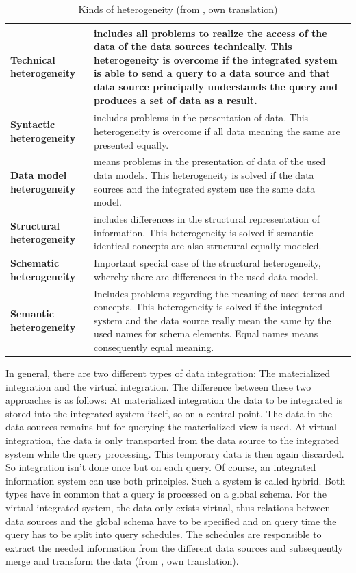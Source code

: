 \begin{table}[]
\centering
\begin{tabular}{|l|p{}|}
\hline
 \textbf{Technical  heterogeneity}  &  includes all problems to realize the access of the data of the data sources technically. This heterogeneity is overcome if the integrated system is able to send a query to a data source and that data source principally understands the query and produces a set of data as a result.\\ \hline
 \textbf{Syntactic  heterogeneity}    &  includes problems in the presentation of data. This heterogeneity is overcome if all data meaning the same are presented equally.\\ \hline
 \textbf{Data model  heterogeneity} &  means problems in the presentation of data of the used data models. This heterogeneity is solved if the data sources and the integrated system use the same data model.\\ \hline
 \textbf{Structural  heterogeneity}    &  includes differences in the structural representation of information. This heterogeneity is solved if semantic identical concepts are also structural equally modeled. \\ \hline
 \textbf{Schematic  heterogeneity} &  Important special case of the structural heterogeneity, whereby there are differences in the used data model.\\ \hline
 \textbf{Semantic  heterogeneity}    &  Includes problems regarding the meaning of used terms and concepts. This heterogeneity is solved if the integrated system and the data source really mean the same by the used names for schema elements. Equal names means consequently equal meaning.\\ \hline
\end{tabular}
\caption{Kinds of heterogeneity (from \cite[p. 60/61]{DBLP:books/dp/LeserN2006}, own translation)}
\label{kinds-of-heterogeneity}
\end{table}

In general, there are two different types of data integration: The materialized integration and the virtual integration. The difference between these two approaches is as follows: At materialized integration the data to be integrated is stored  into the integrated system itself, so on a central point. The data in the data sources remains but for querying the materialized view is used. At virtual integration, the data is only transported from the data source to the integrated system while the query processing. This temporary data is then again discarded. So integration isn't done once but on each query. Of course, an integrated information system can use both principles. Such a system is called hybrid. Both types have in common that a query is processed on a global schema. For the virtual integrated system, the data only exists virtual, thus relations between data sources and the global schema have to be specified and on query time the query has to be split into query schedules. The schedules are responsible to extract the needed information from the different data sources and subsequently merge and transform the data (from \cite[p. 86-88]{DBLP:books/dp/LeserN2006}, own translation).

